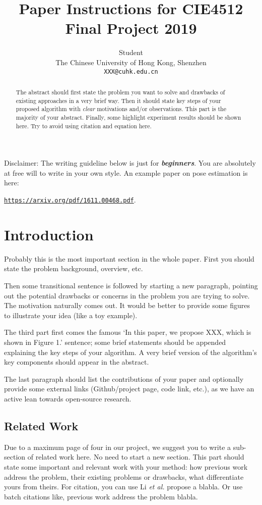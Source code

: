 \documentclass{article}
\title{Paper Instructions for CIE4512 Final Project 2019}
\author{
  Student \\
  The Chinese University of Hong Kong, Shenzhen\\
  \texttt{XXX@cuhk.edu.cn} \\
   \And
}
\begin{document}
\maketitle

\begin{abstract}
  The abstract should first state the problem you want to solve and drawbacks of existing approaches in a very brief way. Then it should state key steps of your proposed algorithm with \textit{clear} motivations and/or observations. This part is the majority of your abstract. Finally, some highlight experiment results should be shown here. Try to avoid using citation and equation here.
\end{abstract}


Disclaimer: The writing guideline below is just for \textbf{\textit{beginners}}. You are absolutely at free will to write in your own style.
%
An example paper on pose estimation is here:

 \href{https://arxiv.org/pdf/1611.00468.pdf}{\texttt{https://arxiv.org/pdf/1611.00468.pdf}}.

\section{Introduction}

Probably this is the most important section in the whole paper. First you should state the problem background, overview, etc.

Then some transitional sentence is followed by starting a new paragraph, pointing out the potential drawbacks or concerns in the problem you are trying to solve. The motivation  naturally comes out. It would be better to provide some figures to illustrate your idea (like a toy example).

The third part first comes the famous `In this paper, we propose XXX, which is shown in Figure 1.' sentence; some brief statements should be appended explaining the key steps of your algorithm. A very brief version of the algorithm's key components should appear in the abstract.

The last paragraph should list the contributions of your paper and optionally provide some external links (Github/project page, code link, etc.), as we have an active lean towards open-source research.

\subsection{Related Work}
Due to a maximum page of four in our project, we suggest you to write a sub-section of related work here. No need to start a new section. This part should state some important and relevant work with your method: how previous work address the problem, their existing problems or drawbacks, what differentiate yours from theirs. For citation, you can use Li \textit{et al.} \cite{MCG} propose a blabla. Or use batch citations like, previous work \cite{bing,scale_aware,Hosang2015Pami} address the problem blabla.
\end{document}
